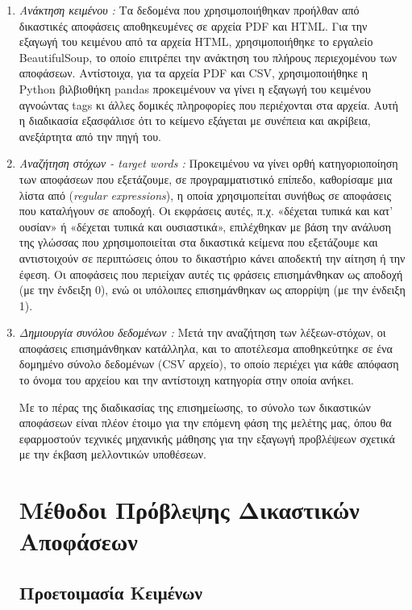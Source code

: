 \documentclass[diploma]{softlab-thesis}
\begin{document}
\begin{enumerate}
\begin{enumerate}
\item \textit{Ανάκτηση κειμένου :} Τα δεδομένα που χρησιμοποιήθηκαν προήλθαν από δικαστικές αποφάσεις αποθηκευμένες σε αρχεία PDF και HTML. Για την εξαγωγή του κειμένου από τα αρχεία HTML, χρησιμοποιήθηκε το εργαλείο BeautifulSoup, το οποίο επιτρέπει την ανάκτηση του πλήρους περιεχομένου των αποφάσεων. Αντίστοιχα, για τα αρχεία PDF και CSV, χρησιμοποιήθηκε η Python βιλβιοθήκη pandas προκειμένουν να γίνει η εξαγωγή του κειμένου αγνοώντας tags κι άλλες δομικές πληροφορίες που περιέχονται στα αρχεία. Αυτή η διαδικασία εξασφάλισε ότι το κείμενο εξάγεται με συνέπεια και ακρίβεια, ανεξάρτητα από την πηγή του.
\item \textit{Αναζήτηση στόχων - target words :} Προκειμένου να γίνει ορθή κατηγοριοποίηση των αποφάσεων που εξετάζουμε, σε προγραμματιστικό επίπεδο, καθορίσαμε μια λίστα από (\textit{regular expressions}), η οποία χρησιμοπείται συνήθως σε αποφάσεις που καταλήγουν σε αποδοχή. Οι εκφράσεις αυτές, π.χ. «δέχεται τυπικά και κατ’ ουσίαν» ή «δέχεται τυπικά και ουσιαστικά», επιλέχθηκαν με βάση την ανάλυση της γλώσσας που χρησιμοποιείται στα δικαστικά κείμενα που εξετάζουμε και αντιστοιχούν σε περιπτώσεις όπου το δικαστήριο κάνει αποδεκτή την αίτηση ή την έφεση. Οι αποφάσεις που περιείχαν αυτές τις φράσεις επισημάνθηκαν ως αποδοχή (με την ένδειξη 0), ενώ οι υπόλοιπες επισημάνθηκαν ως απορρίψη (με την ένδειξη 1).
\item \textit{Δημιουργία συνόλου δεδομένων :} Μετά την αναζήτηση των λέξεων-στόχων, οι αποφάσεις επισημάνθηκαν κατάλληλα, και το αποτέλεσμα αποθηκεύτηκε σε ένα δομημένο σύνολο δεδομένων (CSV αρχείο), το οποίο περιέχει για κάθε απόφαση το όνομα του αρχείου και την αντίστοιχη κατηγορία στην οποία ανήκει.


Με το πέρας της διαδικασίας της επισημείωσης, το σύνολο των δικαστικών αποφάσεων είναι πλέον έτοιμο για την επόμενη φάση της μελέτης μας, όπου θα εφαρμοστούν τεχνικές μηχανικής μάθησης για την εξαγωγή προβλέψεων σχετικά με την έκβαση μελλοντικών υποθέσεων.

 
\chapter{Μέθοδοι Πρόβλεψης Δικαστικών Αποφάσεων}


\section{Προετοιμασία Κειμένων}


\end{enumerate}
\end{enumerate}
\end{document}

